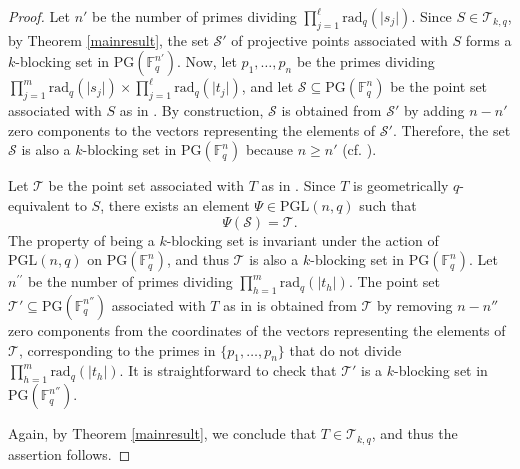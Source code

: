 \documentclass[12pt]{amsart}
\newcommand{\PG}{\mathrm{PG}}
\newcommand{\rad}{\mathrm{rad}_q}
\begin{document}
\begin{proof}
Let \( n' \) be the number of primes dividing \( \prod_{j=1}^{\ell} \rad(\lvert s_j\rvert) \). Since \( S \in \mathcal{T}_{k,q} \), by Theorem \ref{mainresult}, the set \( \mathcal{S}' \) of projective points associated with \( S \) forms a \( k \)-blocking set in \( \PG(\mathbb{F}_{q}^{n'}) \). Now, let \( p_1, \ldots, p_n \) be the primes dividing \( \prod_{j=1}^{m} \text{rad}_{q}(\lvert s_{j} \rvert) \times \prod_{j=1}^{\ell} \text{rad}_{q}(\lvert t_{j} \rvert) \), and let \( \mathcal{S} \subseteq \PG(\mathbb{F}_q^n) \) be the point set associated with \( S \) as in . By construction, \( \mathcal{S} \) is obtained from \( \mathcal{S}' \) by adding \( n - n' \) zero components to the vectors representing the elements of \( \mathcal{S}' \). Therefore, the set \( \mathcal{S} \) is also a \( k \)-blocking set in \( \PG(\mathbb{F}_{q}^{n}) \) because \( n \geq n' \) (cf. \cite[Proposition 2.3]{blokhuis2011blocking}).

Let \( \mathcal{T} \) be the point set associated with \( T \) as in . Since \( T \) is geometrically \( q \)-equivalent to \( S \), there exists an element \( \Psi \in \mathrm{PGL}(n,q) \) such that
\[
\Psi(\mathcal{S}) = \mathcal{T}.
\]
The property of being a \( k \)-blocking set is invariant under the action of \( \mathrm{PGL}(n,q) \) on \( \PG(\mathbb{F}_q^n) \), and thus \( \mathcal{T} \) is also a \( k \)-blocking set in \( \PG(\mathbb{F}_q^n) \). Let \( n^{\prime\prime} \) be the number of primes dividing \( \prod_{h=1}^{m} \text{rad}_{q}(\lvert t_{h} \rvert) \). The point set \( \mathcal{T}' \subseteq \PG(\mathbb{F}_q^{n''}) \) associated with \( T \) as in  is obtained from \( \mathcal{T} \) by removing \( n - n'' \) zero components from the coordinates of the vectors representing the elements of \( \mathcal{T} \), corresponding to the primes in \( \{p_1, \ldots, p_n\} \) that do not divide \( \prod_{h=1}^{m} \text{rad}_{q}(\lvert t_{h} \rvert) \). It is straightforward to check that \( \mathcal{T}' \) is a \( k \)-blocking set in \( \PG(\mathbb{F}_q^{n''}) \).

Again, by Theorem \ref{mainresult}, we conclude that \( T \in \mathcal{T}_{k,q} \), and thus the assertion follows.
\end{proof}
\end{document}
